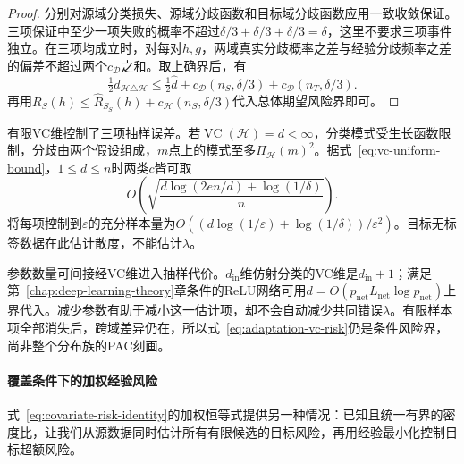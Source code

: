 \begin{proof}
分别对源域分类损失、源域分歧函数和目标域分歧函数应用一致收敛保证。三项保证中至少一项失败的概率不超过$\delta/3+\delta/3+\delta/3=\delta$，这里不要求三项事件独立。在三项均成立时，对每对$h,g$，两域真实分歧概率之差与经验分歧频率之差的偏差不超过两个$c_{\mathcal D}$之和。取上确界后，有
\[
 \tfrac12d_{\mathcal H\triangle\mathcal H}
 \leq\tfrac12\widehat d
 +c_{\mathcal D}(n_S,\delta/3)+c_{\mathcal D}(n_T,\delta/3).
\]
再用$R_S(h)\leq\widehat R_{S_S}(h)+c_{\mathcal H}(n_S,\delta/3)$代入总体期望风险界即可。
\end{proof}

有限VC维控制了三项抽样误差。若$\operatorname{VC}(\mathcal H)=d<\infty$，分类模式受生长函数限制，分歧由两个假设组成，$m$点上的模式至多$\Pi_{\mathcal H}(m)^2$。据式~\eqref{eq:vc-uniform-bound}，$1\leq d\leq n$时两类$c$皆可取
\[
 O\!\left(\sqrt{\frac{d\log(2en/d)+\log(1/\delta)}{n}}\right).
\]
将每项控制到$\varepsilon$的充分样本量为$O((d\log(1/\varepsilon)+\log(1/\delta))/\varepsilon^2)$。目标无标签数据在此估计散度，不能估计$\lambda$。

参数数量可间接经VC维进入抽样代价。$d_{\mathrm{in}}$维仿射分类的VC维是$d_{\mathrm{in}}+1$；满足第~\ref{chap:deep-learning-theory}章条件的ReLU网络可用$d=O(p_{\mathrm{net}}L_{\mathrm{net}}\log p_{\mathrm{net}})$上界代入。减少参数有助于减小这一估计项，却不会自动减少共同错误$\lambda$。有限样本项全部消失后，跨域差异仍在，所以式~\eqref{eq:adaptation-vc-risk}仍是条件风险界，尚非整个分布族的PAC刻画。

\paragraph{覆盖条件下的加权经验风险}
\label{sec:adaptation-coverage}

式~\eqref{eq:covariate-risk-identity}的加权恒等式提供另一种情况：已知且统一有界的密度比，让我们从源数据同时估计所有有限候选的目标风险，再用经验最小化控制目标超额风险。

